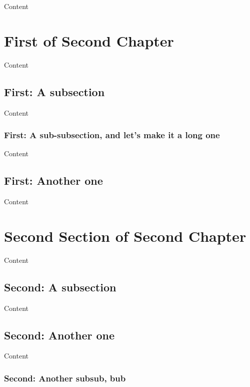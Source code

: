 \documentclass{book}
\newcommand{\insMinitoc}[2][]{%
    \begin{center}#2
    \begin{minipage}[c]{0.8\linewidth}
    \insertminitoc[#1]
    \end{minipage}
    \end{center}
}
\begin{document}
Content

\section{First of Second Chapter}

\insMinitoc{\minitocFmti}

Content

\subsection{First: A subsection}

Content

\subsubsection{First: A sub-subsection, and let's make it a long one}

Content

\subsection{First: Another one}

Content

\section{Second Section  of Second Chapter}

\insMinitoc{\minitocFmti}

Content

\subsection{Second: A subsection}

Content

\subsection{Second: Another one}

Content

\subsubsection{Second: Another subsub, bub}
\end{document}
